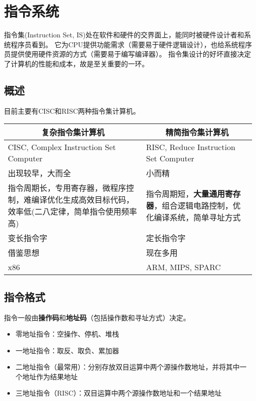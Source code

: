 
\section{指令系统}
指令集(Instruction Set, IS)处在软件和硬件的交界面上，能同时被硬件设计者和系统程序员看到。
它为CPU提供功能需求（需要易于硬件逻辑设计），也给系统程序员提供使用硬件资源的方式（需要易于编写编译器）。
指令集设计的好坏直接决定了计算机的性能和成本，故是至关重要的一环。

\subsection{概述}
目前主要有CISC和RISC两种指令集计算机。
\begin{center}
\begin{tabular}{|p{8cm}|p{8cm}|}
\hline
\multicolumn{1}{|c|}{复杂指令集计算机} & \multicolumn{1}{c|}{精简指令集计算机} \\\hline
CISC, Complex Instruction Set Computer & RISC, Reduce Instruction Set Computer\\\hline
出现较早，大而全 & 小而精 \\\hline
指令周期长，专用寄存器，微程序控制，难编译优化生成高效目标代码，效率低(二八定律，简单指令使用频率高) & 指令周期短，\textbf{大量通用寄存器}，组合逻辑电路控制，优化编译系统，简单寻址方式\\\hline
变长指令字 & 定长指令字 \\\hline
借鉴思想 & 现在多用 \\\hline
x86 & ARM, MIPS, SPARC \\\hline
\end{tabular}
\end{center}

\subsection{指令格式}
指令一般由\textbf{操作码}和\textbf{地址码}（包括操作数和寻址方式）决定。
\begin{itemize}
	\item 零地址指令：空操作、停机、堆栈
	\item 一地址指令：取反、取负、累加器
	\item 二地址指令（最常用）：分别存放双目运算中两个源操作数地址，并将其中一个地址作为结果地址
	\item 三地址指令（RISC）：双目运算中两个源操作数地址和一个结果地址
\end{itemize}

